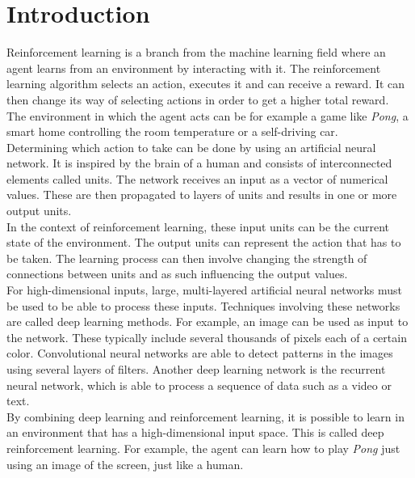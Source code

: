 \chapter{Introduction}

Reinforcement learning is a branch from the machine learning field where an agent learns from an environment by interacting with it.
The reinforcement learning algorithm selects an action, executes it and can receive a reward.
It can then change its way of selecting actions in order to get a higher total reward.\\
The environment in which the agent acts can be for example a game like \textit{Pong}, a smart home controlling the room temperature or a self-driving car.\\

Determining which action to take can be done by using an artificial neural network.
It is inspired by the brain of a human and consists of interconnected elements called units.
The network receives an input as a vector of numerical values.
These are then propagated to layers of units and results in one or more output units.\\
In the context of reinforcement learning, these input units can be the current state of the environment.
The output units can represent the action that has to be taken.
The learning process can then involve changing the strength of connections between units and as such influencing the output values.\\

For high-dimensional inputs, large, multi-layered artificial neural networks must be used to be able to process these inputs. Techniques involving these networks are called deep learning methods.
For example, an image can be used as input to the network.
These typically include several thousands of pixels each of a certain color.
Convolutional neural networks are able to detect patterns in the images using several layers of filters.
Another deep learning network is the recurrent neural network, which is able to process a sequence of data such as a video or text.\\

By combining deep learning and reinforcement learning, it is possible to learn in an environment that has a high-dimensional input space. This is called deep reinforcement learning.
For example, the agent can learn how to play \textit{Pong} just using an image of the screen, just like a human.\\

